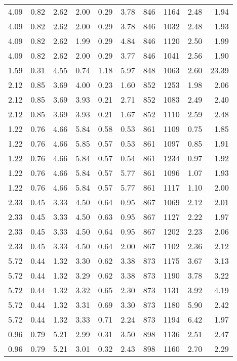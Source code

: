 \begin{longtable}{rrrrrrrrrr}
4.09	&	0.82	&	2.62	&	2.00	&	0.29	&	3.78	&	846	&	1164	&	2.48	&	1.94	\\
4.09	&	0.82	&	2.62	&	2.00	&	0.29	&	3.78	&	846	&	1032	&	2.48	&	1.93	\\
4.09	&	0.82	&	2.62	&	1.99	&	0.29	&	4.84	&	846	&	1120	&	2.50	&	1.99	\\
4.09	&	0.82	&	2.62	&	2.00	&	0.29	&	3.77	&	846	&	1041	&	2.56	&	1.90	\\
1.59	&	0.31	&	4.55	&	0.74	&	1.18	&	5.97	&	848	&	1063	&	2.60	&	23.39	\\
2.12	&	0.85	&	3.69	&	4.00	&	0.23	&	1.60	&	852	&	1253	&	1.98	&	2.06	\\
2.12	&	0.85	&	3.69	&	3.93	&	0.21	&	2.71	&	852	&	1083	&	2.49	&	2.40	\\
2.12	&	0.85	&	3.69	&	3.93	&	0.21	&	1.67	&	852	&	1110	&	2.59	&	2.48	\\
1.22	&	0.76	&	4.66	&	5.84	&	0.58	&	0.53	&	861	&	1109	&	0.75	&	1.85	\\
1.22	&	0.76	&	4.66	&	5.85	&	0.57	&	0.53	&	861	&	1097	&	0.85	&	1.91	\\
1.22	&	0.76	&	4.66	&	5.84	&	0.57	&	0.54	&	861	&	1234	&	0.97	&	1.92	\\
1.22	&	0.76	&	4.66	&	5.84	&	0.57	&	5.77	&	861	&	1096	&	1.07	&	1.93	\\
1.22	&	0.76	&	4.66	&	5.84	&	0.57	&	5.77	&	861	&	1117	&	1.10	&	2.00	\\
2.33	&	0.45	&	3.33	&	4.50	&	0.64	&	0.95	&	867	&	1069	&	2.12	&	2.01	\\
2.33	&	0.45	&	3.33	&	4.50	&	0.63	&	0.95	&	867	&	1127	&	2.22	&	1.97	\\
2.33	&	0.45	&	3.33	&	4.50	&	0.64	&	0.95	&	867	&	1202	&	2.23	&	2.06	\\
2.33	&	0.45	&	3.33	&	4.50	&	0.64	&	2.00	&	867	&	1102	&	2.36	&	2.12	\\
5.72	&	0.44	&	1.32	&	3.30	&	0.62	&	3.38	&	873	&	1175	&	3.67	&	3.13	\\
5.72	&	0.44	&	1.32	&	3.29	&	0.62	&	3.38	&	873	&	1190	&	3.78	&	3.22	\\
5.72	&	0.44	&	1.32	&	3.32	&	0.65	&	2.30	&	873	&	1131	&	3.92	&	4.19	\\
5.72	&	0.44	&	1.32	&	3.31	&	0.69	&	3.30	&	873	&	1180	&	5.90	&	2.42	\\
5.72	&	0.44	&	1.32	&	3.33	&	0.71	&	2.24	&	873	&	1194	&	6.42	&	1.97	\\
0.96	&	0.79	&	5.21	&	2.99	&	0.31	&	3.50	&	898	&	1136	&	2.51	&	2.47	\\
0.96	&	0.79	&	5.21	&	3.01	&	0.32	&	2.43	&	898	&	1160	&	2.70	&	2.29	\\

\end{longtable}
